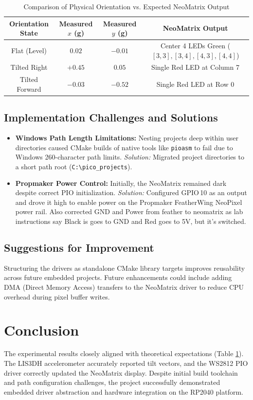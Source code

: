 \documentclass{article}
\begin{document}
\begin{table}[ht]
    \centering
    \caption{Comparison of Physical Orientation vs. Expected NeoMatrix Output}
    \begin{tabular}{|c|c|c|c|}
        \hline
        Orientation State & Measured $x$ (g) & Measured $y$ (g) & NeoMatrix Output \\
        \hline
        Flat (Level) & $0.02$ & $-0.01$ & Center 4 LEDs Green ($[3,3], [3,4], [4,3], [4,4]$) \\
        Tilted Right & $+0.45$ & $0.05$ & Single Red LED at Column 7 \\
        Tilted Forward & $-0.03$ & $-0.52$ & Single Red LED at Row 0 \\
        \hline
    \end{tabular}
    \label{tab:results}
\end{table}

\subsection{Implementation Challenges and Solutions}
\begin{itemize}
    \item \textbf{Windows Path Length Limitations:} Nesting projects deep within user directories caused CMake builds of native tools like \texttt{pioasm} to fail due to Windows 260-character path limits. \textit{Solution:} Migrated project directories to a short path root (\texttt{C:\textbackslash pico\_projects}).
    \item \textbf{Propmaker Power Control:} Initially, the NeoMatrix remained dark despite correct PIO initialization. \textit{Solution:} Configured GPIO\,10 as an output and drove it high to enable power on the Propmaker FeatherWing NeoPixel power rail. Also corrected GND and Power from feather to neomatrix as lab instructions say Black is goes to GND and Red goes to 5V, but it's switched.
\end{itemize}

\subsection{Suggestions for Improvement}
Structuring the drivers as standalone CMake library targets improves reusability across future embedded projects. Future enhancements could include adding DMA (Direct Memory Access) transfers to the NeoMatrix driver to reduce CPU overhead during pixel buffer writes.

\section{Conclusion}
The experimental results closely aligned with theoretical expectations (Table \ref{tab:results}). The LIS3DH accelerometer accurately reported tilt vectors, and the WS2812 PIO driver correctly updated the NeoMatrix display. Despite initial build toolchain and path configuration challenges, the project successfully demonstrated embedded driver abstraction and hardware integration on the RP2040 platform.
\end{document}
